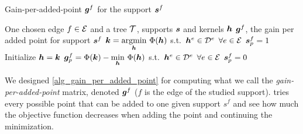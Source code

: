 \begin{algorithm}[!h]
    \caption{Gain-per-added-point $\bm{g}^f$ for the support $\bm{s}^f$}\label{alg_gain_per_added_point}
  \begin{algorithmic}[1]
    \Input One chosen edge $f \in \mathcal E$ and a tree $\mathcal T$, supports $\bm{s}$ and kernels $\bm{h}$
    \Output $\bm{g}^f$, the gain per added point for support $\bm{s}^f$
    \State $\bm{k} = \underset{\bm{h}}{\operatorname{argmin}}~ \Phi (\bm{h})$ \quad s.t.~$\bm{h}^e \in {\mathcal D}^e$ \quad $\forall e \in \mathcal E$ 
    	\State $\bm{s}^f_p = 1$ 
    	\State Initialize $\bm{h} = \bm{k}$
    	\State $\bm{g}^f_p = \Phi(\bm{k}) - \underset{\bm{h}}{\min}~ \Phi (\bm{h})$ \quad s.t.~$\bm{h}^e \in {\mathcal D}^e$ \quad $\forall e \in \mathcal E$
    	\State $\bm{s}^f_p = 0$ 
    \EndFor
  \end{algorithmic}
\end{algorithm}

We designed \cref{alg_gain_per_added_point} for computing what we call the \emph{gain-per-added-point} matrix, denoted $\bm{g}^f$ ($f$ is the edge of the studied support).  tries every possible point that can be added to one given support $s^f$ and see how much the objective function decreases when adding the point and continuing the minimization.

